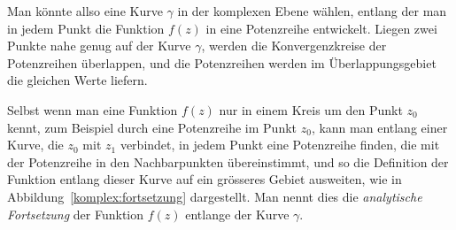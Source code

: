 Man könnte allso eine Kurve $\gamma$ in der komplexen Ebene wählen,
entlang der man in jedem Punkt die Funktion $f(z)$ in eine Potenzreihe
entwickelt.
Liegen zwei Punkte nahe genug auf der Kurve $\gamma$, werden die
Konvergenzkreise der Potenzreihen überlappen, und die Potenzreihen
werden im Überlappungsgebiet die gleichen Werte liefern.

Selbst wenn man eine Funktion $f(z)$ nur in einem Kreis um den Punkt $z_0$
kennt, zum Beispiel durch eine Potenzreihe im Punkt $z_0$, kann man entlang
einer Kurve, die $z_0$ mit $z_1$ verbindet, in jedem Punkt eine Potenzreihe
finden, die mit der Potenzreihe in den Nachbarpunkten übereinstimmt, und
so die Definition der Funktion entlang dieser Kurve auf ein grösseres
Gebiet ausweiten, wie in Abbildung~\ref{komplex:fortsetzung} dargestellt.
Man nennt dies die {\em analytische Fortsetzung} der Funktion $f(z)$
entlange der Kurve $\gamma$.

